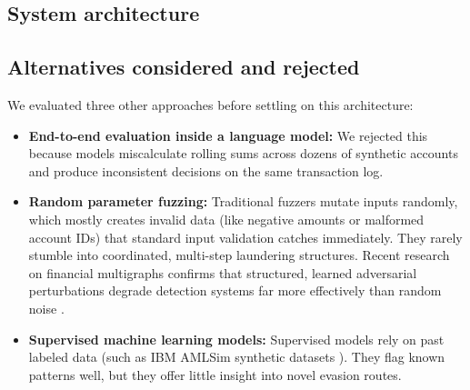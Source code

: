 \documentclass[10pt,twocolumn,a4paper]{article}
\begin{document}
\subsection{System architecture}
\begin{center}
\end{center}

\subsection{Alternatives considered and rejected}
We evaluated three other approaches before settling on this architecture:
\begin{itemize}
    \item \textbf{End-to-end evaluation inside a language model:} We rejected this because models miscalculate rolling sums across dozens of synthetic accounts and produce inconsistent decisions on the same transaction log.
    \item \textbf{Random parameter fuzzing:} Traditional fuzzers mutate inputs randomly, which mostly creates invalid data (like negative amounts or malformed account IDs) that standard input validation catches immediately. They rarely stumble into coordinated, multi-step laundering structures. Recent research on financial multigraphs confirms that structured, learned adversarial perturbations degrade detection systems far more effectively than random noise \cite{heijmans2026}.
    \item \textbf{Supervised machine learning models:} Supervised models rely on past labeled data (such as IBM AMLSim synthetic datasets \cite{ibmamlsim2023}). They flag known patterns well, but they offer little insight into novel evasion routes.
\end{itemize}
\end{document}
